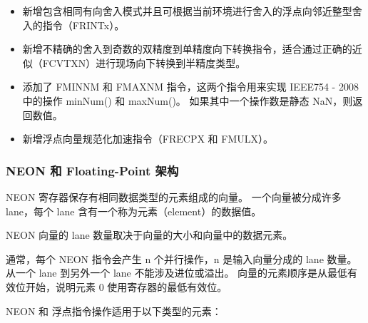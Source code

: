 \begin{itemize}
    \begin{itemize}
      \item[-] 到 0。
      \item[-] 到 $+\inf$。
      \item[-] 到 $-\inf$。
      \item[-] 到一个接近的偶数。
      \item[-] 到更远离零的那个整数\footnote{在“Nearest with ties to away”这种舍入模式下，如果一个值恰好处于两个整数的中间，它会舍入到远离零的整数。
          换句话说，如果一个值恰好处于两个整数的中间，它会舍入到更远离零的那个整数。
        }。
    \end{itemize}
  \item 新增包含相同有向舍入模式并且可根据当前环境进行舍入的浮点向邻近整型舍入的指令（FRINTx）。
  \item 新增不精确的舍入到奇数的双精度到单精度向下转换指令，适合通过正确的近似（FCVTXN）进行现场向下转换到半精度类型。
  \item 添加了 FMINNM 和 FMAXNM 指令，这两个指令用来实现 IEEE754 - 2008 中的操作 minNum() 和 maxNum()。
  如果其中一个操作数是静态 NaN，则返回数值。
  \item 新增浮点向量规范化加速指令（FRECPX 和 FMULX）。
\end{itemize}

\subsubsection{NEON 和 Floating-Point 架构}

NEON 寄存器保存有相同数据类型的元素组成的向量。
一个向量被分成许多 lane，每个 lane 含有一个称为元素（element）的数据值。

NEON 向量的 lane 数量取决于向量的大小和向量中的数据元素。

通常，每个 NEON 指令会产生 n 个并行操作，n 是输入向量分成的 lane 数量。
从一个 lane 到另外一个 lane 不能涉及进位或溢出。
向量的元素顺序是从最低有效位开始，说明元素 0 使用寄存器的最低有效位。

NEON 和 浮点指令操作适用于以下类型的元素：

